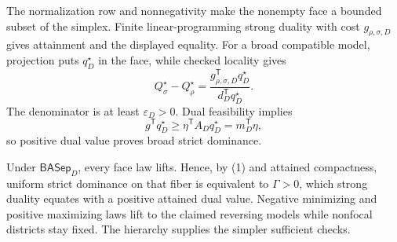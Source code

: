 The normalization row and nonnegativity make the nonempty face a bounded subset of the simplex.  Finite linear-programming strong duality with cost \(g_{\rho,\sigma,D}\) gives attainment and the displayed equality.  For a broad compatible model, projection puts \(q_D^\star\) in the face, while checked locality gives
\[
Q_\sigma^\star-Q_\rho^\star=
\frac{g_{\rho,\sigma,D}^{\mathsf T}q_D^\star}{d_D^{\mathsf T}q_D^\star}.
\tag{1}
\]
The denominator is at least \(\varepsilon_D>0\).  Dual feasibility implies
\[
g^{\mathsf T}q_D^\star\ge\eta^{\mathsf T}A_Dq_D^\star=m_D^{\mathsf T}\eta,
\]
so positive dual value proves broad strict dominance.

Under \(\mathsf{BASep}_D\), every face law lifts.  Hence, by (1) and attained compactness, uniform strict dominance on that fiber is equivalent to \(\Gamma>0\), which strong duality equates with a positive attained dual value.  Negative minimizing and positive maximizing laws lift to the claimed reversing models while nonfocal districts stay fixed.  The hierarchy supplies the simpler sufficient checks.